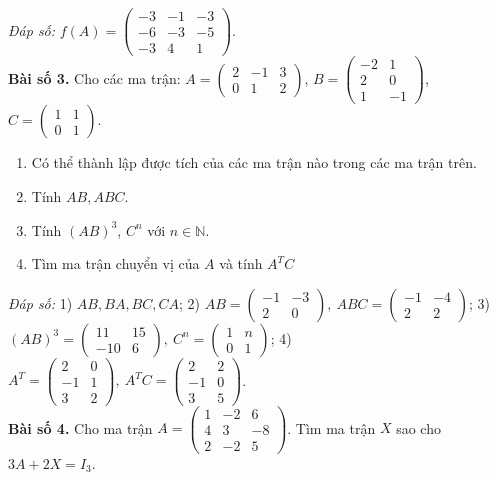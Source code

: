 \textit{Đáp số:} \( f(A) = \begin{pmatrix}
-3 & -1 & -3 \\
-6 & -3 & -5 \\
-3 & 4 & 1
\end{pmatrix} \).\\
\textbf{Bài số 3.} Cho các ma trận: \( A = \begin{pmatrix}
2 & -1 & 3 \\
0 & 1 & 2
\end{pmatrix} \), \( B = \begin{pmatrix}
-2 & 1 \\
2 & 0 \\
1 & -1
\end{pmatrix} \), \( C = \begin{pmatrix}
1 & 1 \\
0 & 1
\end{pmatrix} \).
\begin{enumerate}
    \item Có thể thành lập được tích của các ma trận nào trong các ma trận trên.
    \item Tính \( AB, ABC \).
    \item Tính \((AB)^3\), \(C^n\) với \(n \in \mathbb{N}\).

    \item Tìm ma trận chuyển vị của \(A\) và tính \(A^T C\)
    
\end{enumerate}

\textit{Đáp số:}
1) \(AB, BA, BC, CA\);
2) \(AB = \begin{pmatrix}
-1 & -3 \\
2 & 0
\end{pmatrix}, \ ABC = \begin{pmatrix}
-1 & -4 \\
2 & 2
\end{pmatrix}\);
3) \((AB)^3 = \begin{pmatrix}
11 & 15 \\
-10 & 6
\end{pmatrix}, \ C^n = \begin{pmatrix}
1 & n \\
0 & 1
\end{pmatrix}\);
4) \(A^T = \begin{pmatrix}
2 & 0 \\
-1 & 1 \\
3 & 2
\end{pmatrix}, \ A^T C = \begin{pmatrix}
2 & 2 \\
-1 & 0 \\
3 & 5
\end{pmatrix}\).\\
\textbf{Bài số 4.} Cho ma trận \(A = \begin{pmatrix}
1 & -2 & 6 \\
4 & 3 & -8 \\
2 & -2 & 5
\end{pmatrix}\). Tìm ma trận \(X\) sao cho \(3A + 2X = I_3\).

